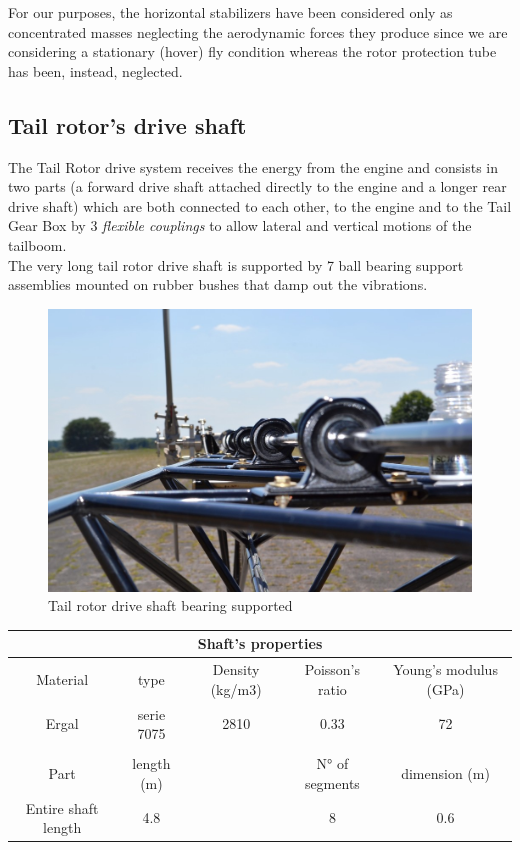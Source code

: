 \noindent
For our purposes, the horizontal stabilizers have been considered only as concentrated masses neglecting the aerodynamic forces they produce since we are considering a stationary (hover) fly condition whereas the rotor protection tube has been, instead, neglected. 

\clearpage
\subsection*{Tail rotor's drive shaft}
\noindent
The Tail Rotor drive system receives the energy from the engine and consists in two parts (a forward drive shaft attached directly to the engine and a longer rear drive shaft) which are both connected to each other, to the engine and to the Tail Gear Box by 3 \emph{flexible couplings} to allow lateral and vertical motions of the tailboom. \\
The very long tail rotor drive shaft is supported by 7 ball bearing support assemblies mounted on rubber bushes that damp out the vibrations.

\smallskip
\begin{figure}[h!]
	\begin{center}
		\centering  		 		
		\includegraphics[width=0.85\linewidth]{PICTURES/2_Lama_truss/PNG/model2/driveshaft}
	\end{center}
	\caption{Tail rotor drive shaft bearing supported}
\end{figure}	

\medskip
\begin{table}[h!]
	\centering
	
	\begin{tabular}{c c c c c} 
		\toprule
		\multicolumn{5}{c}{Shaft's properties}\\
		\midrule
		Material & type & Density (kg/m3) & Poisson's ratio & Young's modulus (GPa) \\
		\midrule
		Ergal & serie 7075 & 2810  &  0.33 & 72 \\ 
		\midrule
		\\
		\midrule
		Part & length (m) &   & N° of segments & dimension (m) \\
		\midrule
		Entire shaft length & 4.8 &   & 8  &  0.6  \\ 
		\bottomrule
	\end{tabular}	
\end{table}

